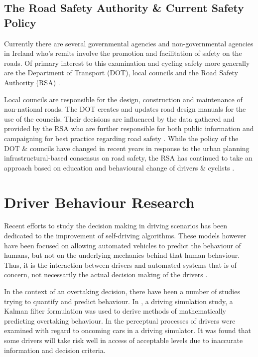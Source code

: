\subsection{The Road Safety Authority \& Current Safety Policy}
Currently there are several governmental agencies and non-governmental agencies in Ireland who's remits involve the promotion and facilitation of safety on the roads. Of primary interest to this examination and cycling safety more generally are the Department of Transport (DOT), local councils and the Road Safety Authority (RSA) \citep{rsaRoadSafetyIreland2022}.

Local councils are responsible for the design, construction and maintenance of non-national roads. The DOT creates and updates road design manuals for the use of the councils. Their decisions are influenced by the data gathered and provided by the RSA who are further responsible for both public information and campaigning for best practice regarding road safety \citep{RoadSafetyReport2021}. While the policy of the DOT \& councils have changed in recent years in response to the urban planning infrastructural-based consensus on road safety, the RSA has continued to take an approach based on education and behavioural change of drivers \& cyclists \citep{rsaCyclistsCampaignRoad2022}.

\section{Driver Behaviour Research}
Recent efforts to study the decision making in driving scenarios has been dedicated to the improvement of self-driving algorithms. These models however have been focused on allowing automated vehicles to predict the behaviour of humans, but not on the underlying mechanics behind that human behaviour. Thus, it is the interaction between drivers and automated systems that is of concern, not necessarily the actual decision making of the drivers \citep{jiHierarchicalGametheoreticDecisionmaking2023, HeuristicsOrientedOvertaking}.

In the context of an overtaking decision, there have been a number of studies trying to quantify and predict behaviour. In \citet{stefanssonModelingDecisionmakingHuman2020}, a driving simulation study, a Kalman filter formulation was used to derive methods of mathematically predicting overtaking behaviour. In \citet{grayPerceptualProcessesUsed2005} the perceptual processes of drivers were examined with regard to oncoming cars in a driving simulator. It was found that some drivers will take risk well in access of acceptable levels due to inaccurate information and decision criteria.

